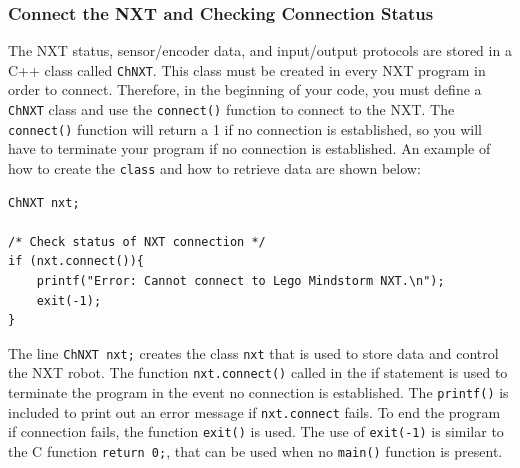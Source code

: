 \documentclass[11pt]{article}
\begin{document}
\subsubsection{Connect the NXT and Checking Connection Status}
The NXT status, sensor/encoder data, and input/output protocols are stored in a 
C++ class called {\tt ChNXT}. This class must be created in every NXT program in 
order to connect. Therefore, in the beginning of your code, you must define a 
{\tt ChNXT} class and use the {\tt connect()} function to connect to the NXT. The 
{\tt connect()} function will return a 1 if no connection is established, so you 
will have to terminate your program if no connection is established. An example 
of how to create the {\tt class} and how to retrieve data are shown below:
\begin{lstlisting}
ChNXT nxt;

/* Check status of NXT connection */
if (nxt.connect()){
    printf("Error: Cannot connect to Lego Mindstorm NXT.\n");
    exit(-1);
}
\end{lstlisting}
The line {\tt ChNXT nxt;} creates the class {\tt nxt} that is used to store data 
and control the NXT robot. The function {\tt nxt.connect()} called in the if 
statement is used to terminate the program in the event no connection is established. 
The {\tt printf()} is included to print out an error message if {\tt nxt.connect} 
fails. To end the program if connection fails, the function {\tt exit()} is used. 
The use of {\tt exit(-1)} is similar to the C function {\tt return 0;}, that can 
be used when no {\tt main()} function is present.

%
\end{document}
